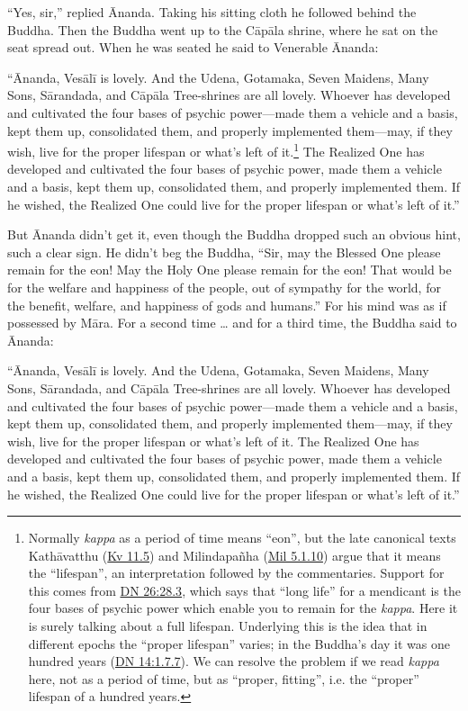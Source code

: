 \documentclass[12pt,openany]{book}%
\begin{document}
“Yes, sir,” replied Ānanda. Taking his sitting cloth he followed behind the Buddha. Then the Buddha went up to the \textsanskrit{Cāpāla} shrine, where he sat on the seat spread out. When he was seated he said to Venerable Ānanda: 

“Ānanda, \textsanskrit{Vesālī} is lovely. And the Udena, Gotamaka, Seven Maidens, Many Sons, \textsanskrit{Sārandada}, and \textsanskrit{Cāpāla} Tree-shrines are all lovely. Whoever has developed and cultivated the four bases of psychic power—made them a vehicle and a basis, kept them up, consolidated them, and properly implemented them—may, if they wish, live for the proper lifespan or what’s left of it.\footnote{Normally \textit{kappa} as a period of time means “eon”, but the late canonical texts \textsanskrit{Kathāvatthu} (\href{https://suttacentral.net/kv11.5}{Kv 11.5}) and \textsanskrit{Milindapañha} (\href{https://suttacentral.net/mil5.1.10}{Mil 5.1.10}) argue that it means the “lifespan”, an interpretation followed by the commentaries. Support for this comes from \href{https://suttacentral.net/dn26/en/sujato\#28.3}{DN 26:28.3}, which says that “long life” for a mendicant is the four bases of psychic power which enable you to remain for the \textit{kappa}. Here it is surely talking about a full lifespan. Underlying this is the idea that in different epochs the “proper lifespan” varies; in the Buddha’s day it was one hundred years (\href{https://suttacentral.net/dn14/en/sujato\#1.7.7}{DN 14:1.7.7}). We can resolve the problem if we read \textit{kappa} here, not as a period of time, but as “proper, fitting”, i.e. the “proper” lifespan of a hundred years. } The Realized One has developed and cultivated the four bases of psychic power, made them a vehicle and a basis, kept them up, consolidated them, and properly implemented them. If he wished, the Realized One could live for the proper lifespan or what’s left of it.” 

But Ānanda didn’t get it, even though the Buddha dropped such an obvious hint, such a clear sign. He didn’t beg the Buddha, “Sir, may the Blessed One please remain for the eon! May the Holy One please remain for the eon! That would be for the welfare and happiness of the people, out of sympathy for the world, for the benefit, welfare, and happiness of gods and humans.” For his mind was as if possessed by \textsanskrit{Māra}. For a second time … and for a third time, the Buddha said to Ānanda: 

“Ānanda, \textsanskrit{Vesālī} is lovely. And the Udena, Gotamaka, Seven Maidens, Many Sons, \textsanskrit{Sārandada}, and \textsanskrit{Cāpāla} Tree-shrines are all lovely. Whoever has developed and cultivated the four bases of psychic power—made them a vehicle and a basis, kept them up, consolidated them, and properly implemented them—may, if they wish, live for the proper lifespan or what’s left of it. The Realized One has developed and cultivated the four bases of psychic power, made them a vehicle and a basis, kept them up, consolidated them, and properly implemented them. If he wished, the Realized One could live for the proper lifespan or what’s left of it.” 
\end{document}
